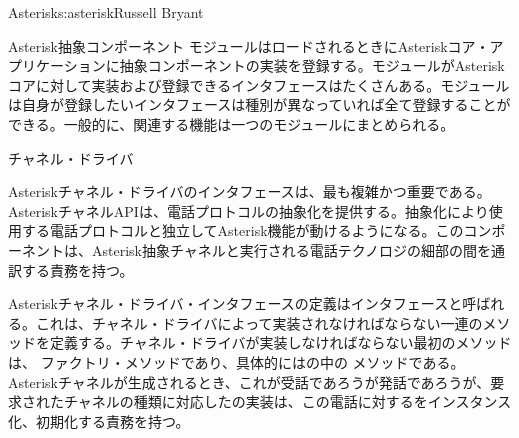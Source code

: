 \begin{aosachapter}{Asterisk}{s:asterisk}{Russell Bryant}
\begin{aosasect1}{Asterisk抽象コンポーネント}
モジュールはロードされるときにAsteriskコア・アプリケーションに抽象コンポーネントの実装を登録する。モジュールがAsteriskコアに対して実装および登録できるインタフェースはたくさんある。モジュールは自身が登録したいインタフェースは種別が異なっていれば全て登録することができる。一般的に、関連する機能は一つのモジュールにまとめられる。

\begin{aosasect2}{チャネル・ドライバ}
\label{sec.asterisk.drivers}

Asteriskチャネル・ドライバのインタフェースは、最も複雑かつ重要である。AsteriskチャネルAPIは、電話プロトコルの抽象化を提供する。抽象化により使用する電話プロトコルと独立してAsterisk機能が動けるようになる。このコンポーネントは、Asterisk抽象チャネルと実行される電話テクノロジの細部の間を通訳する責務を持つ。

Asteriskチャネル・ドライバ・インタフェースの定義はインタフェースと呼ばれる。これは、チャネル・ドライバによって実装されなければならない一連のメソッドを定義する。チャネル・ドライバが実装しなければならない最初のメソッドは、 ファクトリ・メソッドであり、具体的にはの中の メソッドである。Asteriskチャネルが生成されるとき、これが受話であろうが発話であろうが、要求されたチャネルの種類に対応したの実装は、この電話に対するをインスタンス化、初期化する責務を持つ。


\end{aosasect2}
\end{aosasect1}
\end{aosachapter}
